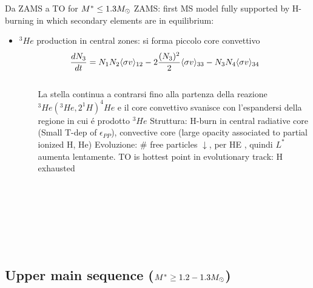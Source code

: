 \begin{frame}{Da ZAMS a TO for $M^*\leq1.3\msun{}$}
ZAMS: first MS model fully supported by H-burning in which secondary elements are in equilibrium:
\begin{itemize}
\item $^3He$ production in central zones: si forma piccolo core convettivo
\[\TDy{t}{N_3}=N_1N_2\exv{\sigma v}_{12}-2\frac{(N_3)^2}{2}\exv{\sigma v}_{33}-N_3N_4\exv{\sigma v}_{34}\]
\end{itemize}
\begin{columns}[T]\begin{column}{0.4\textwidth}
\begin{figure}[!ht]\texttt{[image: HRD-LMS]}\label{fig:HRD-LMS}
\end{figure}
\end{column}\begin{column}{0.6\textwidth}
La stella continua a contrarsi fino alla partenza della reazione $^3He(^3He,2^1H)^4He$ e il core convettivo svanisce con l'espandersi della regione in cui \'e prodotto $^3He$
Struttura: H-burn in central radiative core (Small T-dep of $\epsilon_{PP}$), convective core (large opacity associated to partial ionized H, He)
Evoluzione: $\#$ free particles $\downarrow$, \xaumenta{\mu} per HE 
,  quindi $L^*$ aumenta lentamente.
TO is hottest point in evolutionary track: H exhausted 
\end{column}\end{columns}
\end{frame}


\subsection{Upper main sequence ($M^*\geq1.2-1.3\msun{}$)}

